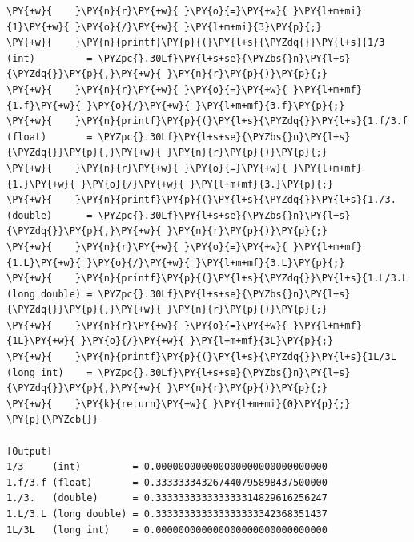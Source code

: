 \begin{Verbatim}[label=\makebox{\url{https://github.com/lucabaldini/cmepda/tree/master/slides/latex/snippets/literals_and_precision.c}},commandchars=\\\{\}]
\PY{+w}{    }\PY{n}{r}\PY{+w}{ }\PY{o}{=}\PY{+w}{ }\PY{l+m+mi}{1}\PY{+w}{ }\PY{o}{/}\PY{+w}{ }\PY{l+m+mi}{3}\PY{p}{;}
\PY{+w}{    }\PY{n}{printf}\PY{p}{(}\PY{l+s}{\PYZdq{}}\PY{l+s}{1/3     (int)         = \PYZpc{}.30Lf}\PY{l+s+se}{\PYZbs{}n}\PY{l+s}{\PYZdq{}}\PY{p}{,}\PY{+w}{ }\PY{n}{r}\PY{p}{)}\PY{p}{;}
\PY{+w}{    }\PY{n}{r}\PY{+w}{ }\PY{o}{=}\PY{+w}{ }\PY{l+m+mf}{1.f}\PY{+w}{ }\PY{o}{/}\PY{+w}{ }\PY{l+m+mf}{3.f}\PY{p}{;}
\PY{+w}{    }\PY{n}{printf}\PY{p}{(}\PY{l+s}{\PYZdq{}}\PY{l+s}{1.f/3.f (float)       = \PYZpc{}.30Lf}\PY{l+s+se}{\PYZbs{}n}\PY{l+s}{\PYZdq{}}\PY{p}{,}\PY{+w}{ }\PY{n}{r}\PY{p}{)}\PY{p}{;}
\PY{+w}{    }\PY{n}{r}\PY{+w}{ }\PY{o}{=}\PY{+w}{ }\PY{l+m+mf}{1.}\PY{+w}{ }\PY{o}{/}\PY{+w}{ }\PY{l+m+mf}{3.}\PY{p}{;}
\PY{+w}{    }\PY{n}{printf}\PY{p}{(}\PY{l+s}{\PYZdq{}}\PY{l+s}{1./3.   (double)      = \PYZpc{}.30Lf}\PY{l+s+se}{\PYZbs{}n}\PY{l+s}{\PYZdq{}}\PY{p}{,}\PY{+w}{ }\PY{n}{r}\PY{p}{)}\PY{p}{;}
\PY{+w}{    }\PY{n}{r}\PY{+w}{ }\PY{o}{=}\PY{+w}{ }\PY{l+m+mf}{1.L}\PY{+w}{ }\PY{o}{/}\PY{+w}{ }\PY{l+m+mf}{3.L}\PY{p}{;}
\PY{+w}{    }\PY{n}{printf}\PY{p}{(}\PY{l+s}{\PYZdq{}}\PY{l+s}{1.L/3.L (long double) = \PYZpc{}.30Lf}\PY{l+s+se}{\PYZbs{}n}\PY{l+s}{\PYZdq{}}\PY{p}{,}\PY{+w}{ }\PY{n}{r}\PY{p}{)}\PY{p}{;}
\PY{+w}{    }\PY{n}{r}\PY{+w}{ }\PY{o}{=}\PY{+w}{ }\PY{l+m+mf}{1L}\PY{+w}{ }\PY{o}{/}\PY{+w}{ }\PY{l+m+mf}{3L}\PY{p}{;}
\PY{+w}{    }\PY{n}{printf}\PY{p}{(}\PY{l+s}{\PYZdq{}}\PY{l+s}{1L/3L   (long int)    = \PYZpc{}.30Lf}\PY{l+s+se}{\PYZbs{}n}\PY{l+s}{\PYZdq{}}\PY{p}{,}\PY{+w}{ }\PY{n}{r}\PY{p}{)}\PY{p}{;}
\PY{+w}{    }\PY{k}{return}\PY{+w}{ }\PY{l+m+mi}{0}\PY{p}{;}
\PY{p}{\PYZcb{}}

[Output]
1/3     (int)         = 0.000000000000000000000000000000
1.f/3.f (float)       = 0.333333343267440795898437500000
1./3.   (double)      = 0.333333333333333314829616256247
1.L/3.L (long double) = 0.333333333333333333342368351437
1L/3L   (long int)    = 0.000000000000000000000000000000
\end{Verbatim}